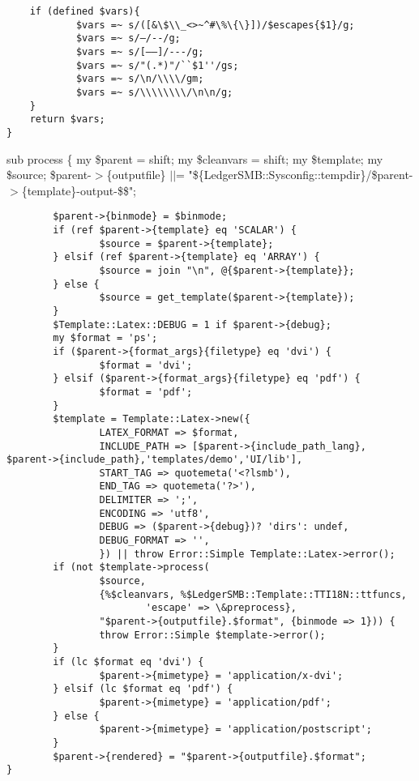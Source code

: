 \begin{description}
\begin{description}
\begin{description}
\begin{description}
\begin{description}
\begin{description}
\begin{description}
\begin{description}
\begin{description}
\begin{description}
\begin{verbatim}
    if (defined $vars){
            $vars =~ s/([&\$\\_<>~^#\%\{\}])/$escapes{$1}/g;
            $vars =~ s/–/--/g;
            $vars =~ s/[—―]/---/g;
            $vars =~ s/"(.*)"/``$1''/gs;
            $vars =~ s/\n/\\\\/gm;
            $vars =~ s/\\\\\\\\/\n\n/g;
    }
    return $vars;
}
\end{verbatim}


sub process \{
	my \$parent = shift;
	my \$cleanvars = shift;
	my \$template;
	my \$source;
	\$parent-$>$\{outputfile\} $|$$|$=
		"\$\{LedgerSMB::Sysconfig::tempdir\}/\$parent-$>$\{template\}-output-\$\$";

\begin{verbatim}
        $parent->{binmode} = $binmode;
        if (ref $parent->{template} eq 'SCALAR') {
                $source = $parent->{template};
        } elsif (ref $parent->{template} eq 'ARRAY') {
                $source = join "\n", @{$parent->{template}};
        } else {
                $source = get_template($parent->{template});
        }
        $Template::Latex::DEBUG = 1 if $parent->{debug};
        my $format = 'ps';
        if ($parent->{format_args}{filetype} eq 'dvi') {
                $format = 'dvi';
        } elsif ($parent->{format_args}{filetype} eq 'pdf') {
                $format = 'pdf';
        }
        $template = Template::Latex->new({
                LATEX_FORMAT => $format,
                INCLUDE_PATH => [$parent->{include_path_lang}, $parent->{include_path},'templates/demo','UI/lib'],
                START_TAG => quotemeta('<?lsmb'),
                END_TAG => quotemeta('?>'),
                DELIMITER => ';',
                ENCODING => 'utf8',
                DEBUG => ($parent->{debug})? 'dirs': undef,
                DEBUG_FORMAT => '',
                }) || throw Error::Simple Template::Latex->error(); 
        if (not $template->process(
                $source, 
                {%$cleanvars, %$LedgerSMB::Template::TTI18N::ttfuncs,
                        'escape' => \&preprocess},
                "$parent->{outputfile}.$format", {binmode => 1})) {
                throw Error::Simple $template->error();
        }
        if (lc $format eq 'dvi') {
                $parent->{mimetype} = 'application/x-dvi';
        } elsif (lc $format eq 'pdf') {
                $parent->{mimetype} = 'application/pdf';
        } else {
                $parent->{mimetype} = 'application/postscript';
        }
        $parent->{rendered} = "$parent->{outputfile}.$format";
}
\end{verbatim}



\end{description}
\end{description}
\end{description}
\end{description}
\end{description}
\end{description}
\end{description}
\end{description}
\end{description}
\end{description}
